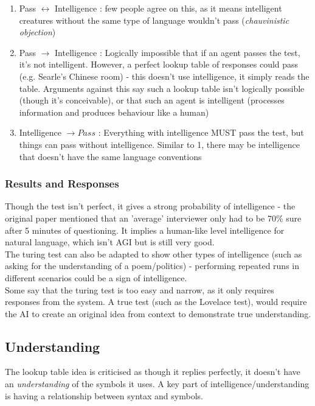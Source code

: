 \begin{enumerate}
    \item Pass $\leftrightarrow$ Intelligence : few people agree on this, as it means intelligent creatures without the same type of language wouldn't pass (\emph{chauvinistic objection})
    
    \item Pass $\rightarrow$ Intelligence : Logically impossible that if an agent passes the test, it's not intelligent. However, a perfect lookup table of responses could pass (e.g. Searle's Chinese room) - this doesn't use intelligence, it simply reads the table. Arguments against this say such a lookup table isn't logically possible (though it's conceivable), or that such an agent is intelligent (processes information and produces behaviour like a human)
    
    \item Intelligence $\rightarrow Pass$ : Everything with intelligence MUST pass the test, but things can pass without intelligence. Similar to 1, there may be intelligence that doesn't have the same language conventions
\end{enumerate}

\subsubsection{Results and Responses}
Though the test isn't perfect, it gives a strong probability of intelligence - the original paper mentioned that an 'average' interviewer only had to be 70\% sure after 5 minutes of questioning. It implies a human-like level intelligence for natural language, which isn't AGI but is still very good.\\
The turing test can also be adapted to show other types of intelligence (such as asking for the understanding of a poem/politics) - performing repeated runs in different scenarios could be a sign of intelligence.\\
Some say that the turing test is too easy and narrow, as it only requires responses from the system. A true test (such as the Lovelace test), would require the AI to create an original idea from context to demonstrate true understanding. 

\subsection{Understanding}
The lookup table idea is criticised as though it replies perfectly, it doesn't have an \emph{understanding} of the symbols it uses. A key part of intelligence/understanding is having a relationship between syntax and symbols.

